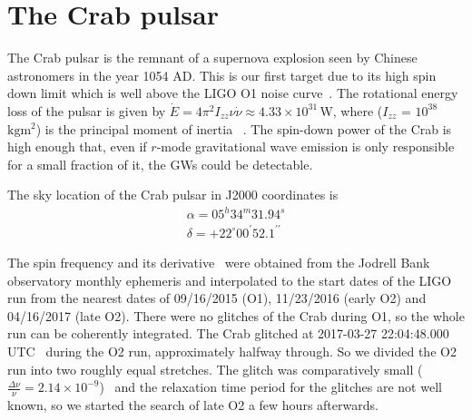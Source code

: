 \documentclass{ttuthes2007}
\begin{document}
\section{The Crab pulsar} \label{timing}
The Crab pulsar is the remnant of a supernova explosion seen by
Chinese astronomers in the year 1054 AD. This is our first target due to its
high spin down limit which is well above the LIGO \ac{O1} noise
curve~\cite{PhysRevD.100.064013}. The rotational energy loss of the
pulsar is given by $\dot{E}=4\pi^2I_{zz}\nu\dot{\nu}\approx
4.33\times10^{31}$\,W, 
where ($I_{zz}$ = $10^{38}$\,$\mathrm{kgm^2}$) is the principal moment of inertia ~\cite{Abbott_2008}. 
The spin-down power of the Crab is high enough that, even if
$r$-mode gravitational wave emission is only responsible for a small fraction of
it, the \acp{GW} could be detectable.
 
The sky location of the Crab pulsar in J2000 coordinates is~\cite{1993MNRAS.265.1003L} 
\begin{equation}
\begin{aligned} 
\alpha =05^h34^m31.94^s\\ 
\delta=
+22^\circ00^\prime52.1^{\prime\prime} 
\end{aligned} 
\end{equation}
 
The spin frequency and its derivative~\cite{1993MNRAS.265.1003L} were obtained
from the Jodrell Bank observatory monthly ephemeris and interpolated to the
start dates of the LIGO run from the nearest dates of 09/16/2015 (\ac{O1}),
11/23/2016 (early O2) and 04/16/2017 (late O2). There were no glitches of the
Crab during \ac{O1}, so the whole run can be coherently integrated. The Crab
glitched at 2017-03-27 22:04:48.000 UTC~\cite{Espinoza_2011} during the \ac{O2}
run, approximately halfway through. So we divided the \ac{O2} run into two
roughly equal stretches.  The glitch was comparatively small
($\frac{\Delta\nu}{\nu}= 2.14\times 10^{-9}$)~\cite{Espinoza_2011} and the
relaxation time period for the glitches are not well known, so we started the
search of late \ac{O2} a few hours afterwards.
\end{document}
